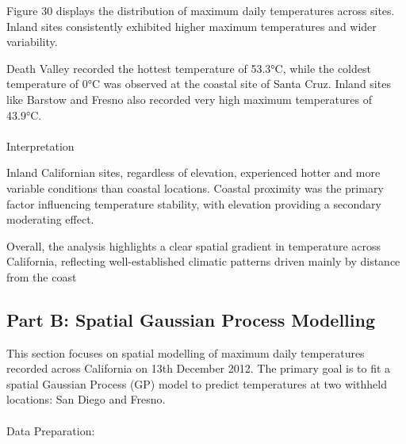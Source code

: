 \documentclass[
  11pt,
]{article}
\makeatletter
\let\oldparagraph\paragraph
\renewcommand{\paragraph}{
    \@ifstar
      \xxxParagraphStar
      \xxxParagraphNoStar
  }
\newcommand{\xxxParagraphStar}[1]{\oldparagraph*{#1}\mbox{}}
\newcommand{\xxxParagraphNoStar}[1]{\oldparagraph{#1}\mbox{}}
\makeatother
\begin{document}
Figure 30 displays the distribution of maximum daily temperatures across
sites. Inland sites consistently exhibited higher maximum temperatures
and wider variability.

Death Valley recorded the hottest temperature of 53.3°C, while the
coldest temperature of 0°C was observed at the coastal site of Santa
Cruz. Inland sites like Barstow and Fresno also recorded very high
maximum temperatures of 43.9°C.

\paragraph{Interpretation}\label{interpretation-1}

Inland Californian sites, regardless of elevation, experienced hotter
and more variable conditions than coastal locations. Coastal proximity
was the primary factor influencing temperature stability, with elevation
providing a secondary moderating effect.

Overall, the analysis highlights a clear spatial gradient in temperature
across California, reflecting well-established climatic patterns driven
mainly by distance from the coast

\subsection{Part B: Spatial Gaussian Process
Modelling}\label{part-b-spatial-gaussian-process-modelling}

This section focuses on spatial modelling of maximum daily temperatures
recorded across California on 13th December 2012. The primary goal is to
fit a spatial Gaussian Process (GP) model to predict temperatures at two
withheld locations: San Diego and Fresno.

\paragraph{Data Preparation:}\label{data-preparation}
\end{document}
